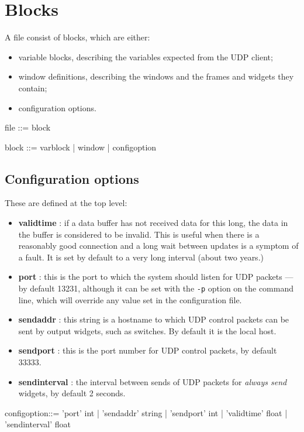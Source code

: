 \section{Blocks}
A file consist of blocks, which are either:
\begin{itemize}
\item variable blocks, describing the variables expected from the UDP client;
\item window definitions, describing the windows and the frames and widgets
they contain;
\item configuration options.
\end{itemize}

\begin{v}
file        ::= { block }

block       ::= varblock
            |   window
            |   configoption
\end{v}

\subsection{Configuration options}
These are defined at the top level:
\begin{itemize}
\item \textbf{validtime} : if a data buffer has not received data for this long, the data in the buffer is 
considered to be invalid. This is useful when there is a reasonably good connection and a long wait between updates
is a symptom of a fault. It is set by default to a very long interval (about two years.)
\item \textbf{port} : this is the port to which the system should listen for UDP packets --- by default 13231, although
it can be set with the \verb+-p+ option on the command line, which will override any value set in the configuration file.
\item \textbf{sendaddr} : this string is a hostname to which UDP control packets can be sent by output widgets, such as 
switches. By default it is the local host.
\item \textbf{sendport} : this is the port number for UDP control packets, by default 33333.
\item \textbf{sendinterval} : the interval between sends of UDP packets for \emph{always send} widgets, by default 2 seconds.
\end{itemize}
\begin{v}
configoption::= 'port' int
            |   'sendaddr' string
            |   'sendport' int
            |   'validtime' float
            |   'sendinterval' float
\end{v}

